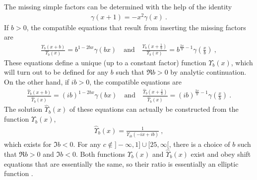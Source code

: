 \documentclass[12pt, a4paper, notitlepage, twoside]{report}
\numberwithin{equation}{section}
\theoremstyle{break}
\begin{document}
The missing simple factors can be determined with the help of the identity
\begin{align}
 \gamma(x+1) = -x^2 \gamma(x) \ .
\end{align}
If $b>0$, the compatible equations that result from inserting the missing factors are 
\begin{align}
  \boxed{\frac{\Upsilon_b(x+b)}{\Upsilon_b(x)} = b^{1-2bx} \gamma(bx)}\quad \text{and} \quad \boxed{\frac{\Upsilon_b(x+\frac{1}{b})}{\Upsilon_b(x)} = b^{\frac{2x}{b}-1} \gamma(\tfrac{x}{b})}\ ,
\label{upup}
\end{align}
These equations define a unique (up to a constant factor) function $\Upsilon_b(x)$, which will turn out to be defined for any $b$ such that $\Re b > 0$ by analytic continuation. 
On the other hand, if $ib>0$, the compatible equations are 
\begin{align}
 \frac{\hat{\Upsilon}_b(x+b)}{\hat{\Upsilon}_b(x)} = (ib)^{1-2bx} \gamma(bx)\quad \text{and} \quad \frac{\hat{\Upsilon}_b(x+\frac{1}{b})}{\hat{\Upsilon}_b(x)} = (ib)^{\frac{2x}{b}-1} \gamma(\tfrac{x}{b})\ .
\end{align}
The solution $\hat\Upsilon_b(x)$ of these equations can actually be constructed from the function $\Upsilon_b(x)$,
\begin{align}
 \boxed{ \hat{\Upsilon}_b(x) = \frac{1}{\Upsilon_{ib}(-ix+ib)} }\ ,
\label{tub}
\end{align}
which exists for $\Im b < 0$. 
For any $c\notin ]-\infty, 1] \cup [25,\infty[$, there is a choice of $b$ such that $\Re b>0$ and $\Im b<0$. 
Both functions $\Upsilon_b(x)$ and $\hat\Upsilon_b(x)$ exist and obey shift equations that are essentially the same, so their ratio is essentially an elliptic function \cite{zam05}. 
\end{document}
